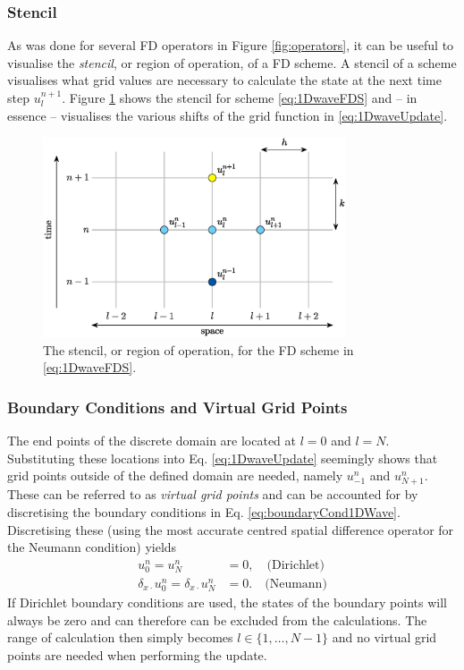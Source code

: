 \subsubsection{Stencil}
As was done for several FD operators in Figure \ref{fig:operators}, it can be useful to visualise the \textit{stencil}, or region of operation, of a FD scheme. A stencil of a scheme visualises what grid values are necessary to calculate the state at the next time step $u_l^{n+1}$. Figure \ref{fig:stencil1DWave} shows the stencil for scheme \eqref{eq:1DwaveFDS} and -- in essence -- visualises the various shifts of the grid function in \eqref{eq:1DwaveUpdate}. 

\begin{figure}[h]
    \centering
    \includegraphics[width=0.8\textwidth]{figures/fdtd/1DWaveStencil.eps}
    \caption{The stencil, or region of operation, for the FD scheme in \eqref{eq:1DwaveFDS}.\label{fig:stencil1DWave}}
\end{figure}

\subsubsection{Boundary Conditions and Virtual Grid Points}
The end points of the discrete domain are located at $l = 0$ and $l = N$.
Substituting these locations into Eq. \eqref{eq:1DwaveUpdate} seemingly shows that grid points outside of the defined domain are needed, namely $u_{-1}^n$ and $u_{N+1}^n$. These can be referred to as \textit{virtual grid points} and can be accounted for %
by discretising the boundary conditions in Eq. \eqref{eq:boundaryCond1DWave}. Discretising these (using the most accurate centred spatial difference operator for the Neumann condition) yields
\begin{subequations}
    \begin{align}
        u_0^n = u_N^n &= 0, \quad\text{(Dirichlet)}\label{eq:discreteDirichlet}\\
        \delta_{x\cdot} u_0^n = \delta_{x\cdot} u_N^n &= 0. \quad \text{(Neumann)}\label{eq:discreteNeumann}
    \end{align}
\end{subequations}
If Dirichlet boundary conditions are used, the states of the boundary points will always be zero and can therefore can be excluded from the calculations. The range of calculation then simply becomes $l\in\{1,\hdots, N-1\}$ and no virtual grid points are needed when performing the update.

